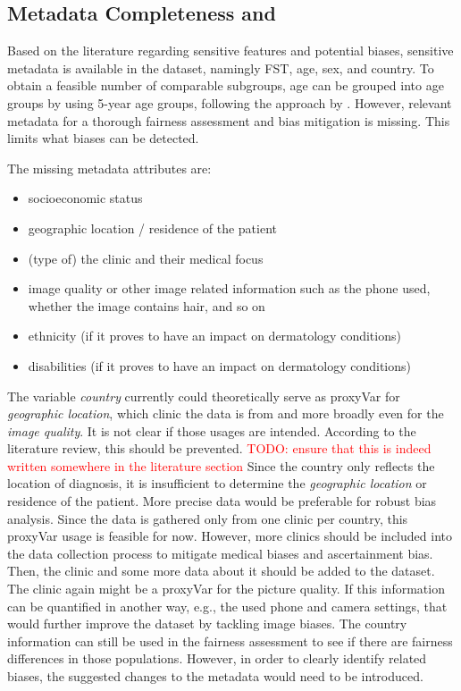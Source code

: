 \documentclass[12pt, a4paper, oneside]{book}   	%
\renewcommand{\todo}[1]{\textcolor{red}{TODO: #1}}
\begin{document}
		\subsection{Metadata Completeness and } \label{chap:datasetAssessmentMetadataEvaluation}
		Based on the literature regarding sensitive features and potential biases, sensitive metadata is available in the dataset, namingly \gls{FST}, age, sex, and country. To obtain a feasible number of comparable subgroups, age can be grouped into age groups by using 5-year age groups, following the approach by \textcite{Gottfrois2024}.
		However, relevant metadata for a thorough fairness assessment and bias mitigation is missing. This limits what biases can be detected.
		
		The missing metadata attributes are:
		\begin{itemize}
			\item socioeconomic status
			\item geographic location / residence of the patient
			\item (type of) the clinic and their medical focus
			\item image quality or other image related information such as the phone used, whether the image contains hair, and so on
			\item ethnicity (if it proves to have an impact on dermatology conditions)
			\item disabilities (if it proves to have an impact on dermatology conditions)
		\end{itemize}
		
		The variable \textit{country} currently could theoretically serve as \gls{proxyVar} for \textit{geographic location}, which clinic the data is from and more broadly even for the \textit{image quality}. It is not clear if those usages are intended. According to the literature review, this should be prevented. \todo{ensure that this is indeed written somewhere in the literature section}
		Since the country only reflects the location of diagnosis, it is insufficient to determine the \textit{geographic location} or residence of the patient. More precise data would be preferable for robust bias analysis.
		Since the data is gathered only from one clinic per country, this \gls{proxyVar} usage is feasible for now. However, more clinics should be included into the data collection process to mitigate medical biases and ascertainment bias. Then, the clinic and some more data about it should be added to the dataset.
		The clinic again might be a \gls{proxyVar} for the picture quality. If this information can be quantified in another way, e.g., the used phone and camera settings, that would further improve the dataset by tackling image biases.
		The country information can still be used in the fairness assessment to see if there are fairness differences in those populations. However, in order to clearly identify related biases, the suggested changes to the metadata would need to be introduced.
		
\end{document}
